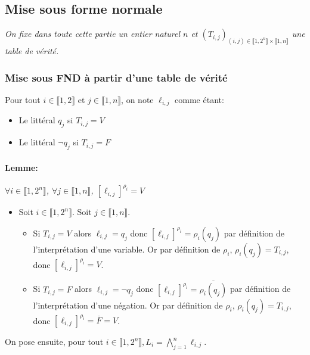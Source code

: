 \documentclass{scrartcl}
\newenvironment{demo}{\begin{itemize}[label=$\triangleright$]\item }{\end{itemize}}
\newcommand{\intset}[1]{\llbracket #1 \rrbracket}
\newcommand{\definition}[1]{{\parindent0pt #1}}
\begin{document}
		\subsection{Mise sous forme normale}
			\begin{center}\textsl{On fixe dans toute cette partie un entier naturel $n$ 
			et $(T_{i,j})_{(i,j)\in\intset{1,2^n}\times\intset{1,n}}$ une table de vérité.}\end{center}
			\subsubsection{Mise sous FND à partir d'une table de vérité}
				Pour tout $i \in \intset{1,2}$ et $j \in \intset{1,n}$, on note $\ell_{i,j}$ comme étant:
				\\[-5pt]
				\begin{itemize}
					\item Le littéral $q_j$ si $T_{i,j} = V$
					\item Le littéral $\neg q_j$ si $T_{i,j} = F$
				\end{itemize}

				\paragraph{Lemme:} \textsl{$\forall i \in \intset{1,2^n}$, $\forall j \in \intset{1,n}$, $[\ell_{i,j}]^{\rho_i} = V$}
				\begin{demo}
					Soit $i \in \intset{1,2^n}$. Soit $j \in \intset{1,n}$.
					\begin{itemize}
						\item Si $T_{i,j} = V$ alors $\ell_{i,j} = q_j$ donc $[\ell_{i,j}]^{\rho_i} = \rho_i(q_j)$ par définition de l'interprétation d'une variable. 
						Or par définition de $\rho_i$, $\rho_i(q_j) = T_{i,j}$, donc $[\ell_{i,j}]^{\rho_i}=V$.
						\item Si $T_{i,j} = F$ alors $\ell_{i,j} = \neg q_j$ donc $[\ell_{i,j}]^{\rho_i} = \overline{\rho_i(q_j)}$ par définition de l'interprétation d'une négation. 
						Or par définition de $\rho_i$, $\rho_i(q_j) = T_{i,j}$, donc $[\ell_{i,j}]^{\rho_i}=\overline{F}=V$.
					\end{itemize}
				\end{demo}

				\definition{On pose ensuite, pour tout $i\in\intset{1,2^n}, L_i = \bigwedge\limits_{j=1}^n \ell_{i,j}$.}
\end{document}
